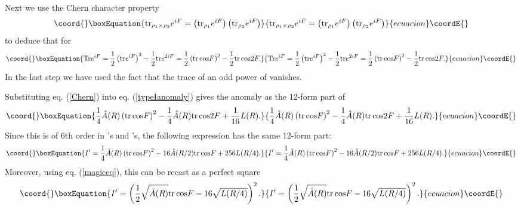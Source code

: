 \documentclass[a4paper,12pt]{article}
\begin{document}
Next we use the Chern character property
\begin{equation}\coord{}\boxEquation{
{\rm tr}_{\rho_1 \times \rho_2} e^{iF} = \left({\rm tr}_{\rho_1 }
e^{iF} \right) \left( {\rm tr}_{\rho_2} e^{iF} \right)
}{
{\rm tr}_{\rho_1 \times \rho_2} e^{iF} = \left({\rm tr}_{\rho_1 }
e^{iF} \right) \left( {\rm tr}_{\rho_2} e^{iF} \right)
}{ecuacion}\coordE{}\end{equation}
to deduce that for \coordHE{}
\begin{equation}\coord{}\boxEquation{ \label{Chern}
{\rm Tr} e^{iF} = {1 \over 2} \left( {\rm tr} e^{iF} \right)^2 -
{1 \over 2} {\rm tr} e^{2iF} = {1 \over 2} \left( {\rm tr} \, {\rm
cos}  F \right)^2 - {1 \over 2} {\rm tr}\, {\rm cos} 2F.
}{ {\rm Tr} e^{iF} = {1 \over 2} \left( {\rm tr} e^{iF} \right)^2 -
{1 \over 2} {\rm tr} e^{2iF} = {1 \over 2} \left( {\rm tr} \, {\rm
cos}  F \right)^2 - {1 \over 2} {\rm tr}\, {\rm cos} 2F.
}{ecuacion}\coordE{}\end{equation}
In the last step we have used the fact that the trace of an odd
power of \coordHE{} vanishes.

Substituting eq. (\ref{Chern}) into eq. (\ref{typeIanomaly}) gives
the anomaly as the 12-form part of
\begin{equation}\coord{}\boxEquation{
 {1 \over 4}\hat A (R) \left( {\rm tr} \, {\rm
cos}  F \right)^2 - {1 \over 4} \hat A(R) {\rm tr}\, {\rm cos} 2F
+ {1 \over 16} L(R) .
}{
 {1 \over 4}\hat A (R) \left( {\rm tr} \, {\rm
cos}  F \right)^2 - {1 \over 4} \hat A(R) {\rm tr}\, {\rm cos} 2F
+ {1 \over 16} L(R) .
}{ecuacion}\coordE{}\end{equation}
Since this is of 6th order in \coordHE{}'s and \coordHE{}'s, the following
expression has the same 12-form part:
\begin{equation}\coord{}\boxEquation{
I' = {1 \over 4}\hat A (R) \left( {\rm tr} \, {\rm cos}  F
\right)^2 - 16 \hat A(R/2) {\rm tr}\, {\rm cos} F + 256 L(R/4) .
}{
I' = {1 \over 4}\hat A (R) \left( {\rm tr} \, {\rm cos}  F
\right)^2 - 16 \hat A(R/2) {\rm tr}\, {\rm cos} F + 256 L(R/4) .
}{ecuacion}\coordE{}\end{equation}
Moreover, using eq. (\ref{magiceq}), this can be recast as a
perfect square
\begin{equation}\coord{}\boxEquation{
I' = \left( {1 \over 2}\sqrt{\hat A (R)}  {\rm tr} \, {\rm cos} F
- 16 \sqrt{ L(R/4)} \right)^2 .
}{
I' = \left( {1 \over 2}\sqrt{\hat A (R)}  {\rm tr} \, {\rm cos} F
- 16 \sqrt{ L(R/4)} \right)^2 .
}{ecuacion}\coordE{}\end{equation}
\end{document}
